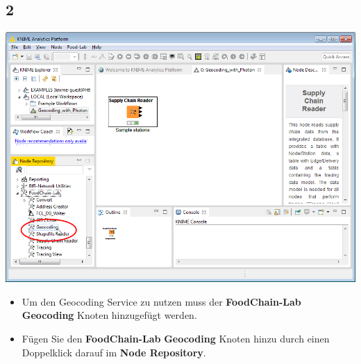 \documentclass{beamer}
\begin{document}
\subsection{2}
\begin{frame}
	\begin{center}
  		\includegraphics[height=0.6\textheight]{2.png}
	\end{center}
	\begin{itemize}
        \item Um den Geocoding Service zu nutzen muss der \textbf{FoodChain-Lab} \textbf{Geocoding} Knoten hinzugefügt werden.
		\item Fügen Sie den \textbf{FoodChain-Lab} \textbf{Geocoding} Knoten hinzu durch einen Doppelklick darauf im \textbf{Node Repository}.
	\end{itemize}
\end{frame}
\end{document}
